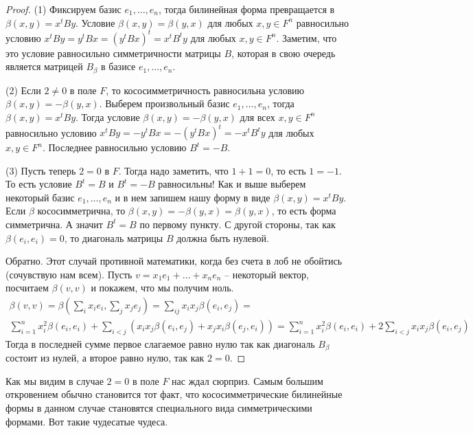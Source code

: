 \begin{proof}
(1) Фиксируем базис $e_1,\ldots,e_n$, тогда билинейная форма превращается в $\beta(x,y) = x^t B y$.
Условие $\beta(x,y) = \beta(y,x)$ для любых $x,y\in F^n$ равносильно условию $x^t B y = y^t B x = (y^t B x)^t = x^t B^t y$ для любых $x,y\in F^n$.
Заметим, что это условие равносильно симметричности матрицы $B$, которая в свою очередь является матрицей $B_\beta$ в базисе $e_1,\ldots,e_n$.

(2) Если $2\neq 0$ в поле $F$, то кососимметричность равносильна условию $\beta(x,y) = -\beta(y,x)$.
Выберем произвольный базис $e_1,\ldots,e_n$, тогда $\beta(x,y) = x^t By$.
Тогда условие $\beta(x,y) = -\beta(y,x)$ для всех $x,y\in F^n$ равносильно условию $x^t By = -y^t Bx = -(y^t B x)^t =- x^t B^t y$ для любых $x,y\in F^n$.
Последнее равносильно условию $B^t = - B$.

(3) Пусть теперь $2 = 0$ в $F$.
Тогда надо заметить, что $1 + 1 = 0$, то есть $1 = - 1$.
То есть условие $B^t = B$ и $B^t = - B$ равносильны!
Как и выше выберем некоторый базис $e_1,\ldots,e_n$ и в нем запишем нашу форму в виде $\beta(x,y) = x^t B y$.
Если $\beta$ кососимметрична, то $\beta(x,y) = -\beta(y,x) = \beta(y,x)$, то есть форма симметрична.
А значит $B^t = B$ по первому пункту.
С другой стороны, так как $\beta(e_i,e_i) = 0$, то диагональ матрицы $B$ должна быть нулевой.

Обратно.
Этот случай противной математики, когда без счета в лоб не обойтись (сочувствую нам всем).
Пусть $v = x_1e_1+\ldots+x_ne_n$ -- некоторый вектор, посчитаем $\beta(v,v)$ и покажем, что мы получим ноль.
\begin{gather*}
\beta(v,v) = \beta(\sum_i x_i e_i, \sum_j x_j e_j) = \sum_{ij}x_ix_j \beta(e_i,e_j) =\\ \sum_{i=1}^nx_i^2 \beta(e_i, e_i) + \sum_{i<j}(x_i x_j \beta(e_i, e_j) + x_j x_i \beta(e_j, e_i)) = \sum_{i=1}^nx_i^2 \beta(e_i, e_i) + 2\sum_{i<j}x_i x_j \beta(e_i, e_j)
\end{gather*}
Тогда в последней сумме первое слагаемое равно нулю так как диагональ $B_\beta$ состоит из нулей, а второе равно нулю, так как $2 = 0$.
\end{proof}

Как мы видим в случае $2 = 0$ в поле $F$ нас ждал сюрприз.
Самым большим откровением обычно становится тот факт, что кососимметрические билинейные формы в данном случае становятся специального вида симметрическими формами.
Вот такие чудесатые чудеса.
